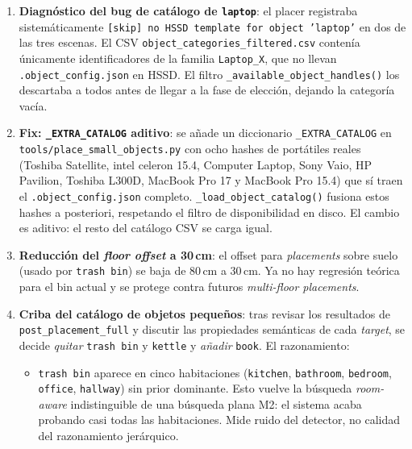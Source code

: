 \documentclass[11pt,a4paper]{article}
\begin{document}
\begin{enumerate}
  \item \textbf{Diagnóstico del bug de catálogo de \texttt{laptop}}:
        el placer registraba sistemáticamente
        \texttt{[skip] no HSSD template for object 'laptop'} en dos de
        las tres escenas. El CSV
        \texttt{object\_categories\_filtered.csv} contenía únicamente
        identificadores de la familia \texttt{Laptop\_X}, que no llevan
        \texttt{.object\_config.json} en HSSD. El filtro
        \texttt{\_available\_object\_handles()} los descartaba a todos
        antes de llegar a la fase de elección, dejando la categoría
        vacía.
  \item \textbf{Fix: \texttt{\_EXTRA\_CATALOG} aditivo}: se añade un
        diccionario \texttt{\_EXTRA\_CATALOG} en
        \texttt{tools/place\_small\_objects.py} con ocho hashes de
        portátiles reales (Toshiba Satellite, intel celeron 15.4,
        Computer Laptop, Sony Vaio, HP Pavilion, Toshiba L300D, MacBook
        Pro 17 y MacBook Pro 15.4) que sí traen el \texttt{.object\_config.json}
        completo. \texttt{\_load\_object\_catalog()} fusiona estos
        hashes a posteriori, respetando el filtro de disponibilidad
        en disco. El cambio es aditivo: el resto del catálogo CSV se
        carga igual.
  \item \textbf{Reducción del \emph{floor offset} a 30\,cm}: el offset
        para \emph{placements} sobre suelo (usado por \texttt{trash bin})
        se baja de 80\,cm a 30\,cm. Ya no hay regresión teórica para el
        bin actual y se protege contra futuros \emph{multi-floor placements}.
  \item \textbf{Criba del catálogo de objetos pequeños}: tras revisar
        los resultados de \texttt{post\_placement\_full} y discutir las
        propiedades semánticas de cada \emph{target}, se decide
        \emph{quitar} \texttt{trash bin} y \texttt{kettle} y
        \emph{añadir} \texttt{book}. El razonamiento:
        \begin{itemize}
          \item \texttt{trash bin} aparece en cinco habitaciones
                (\texttt{kitchen}, \texttt{bathroom}, \texttt{bedroom},
                \texttt{office}, \texttt{hallway}) sin prior dominante.
                Esto vuelve la búsqueda \emph{room-aware} indistinguible
                de una búsqueda plana M2: el sistema acaba probando
                casi todas las habitaciones. Mide ruido del detector,
                no calidad del razonamiento jerárquico.

\end{itemize}
\end{enumerate}
\end{document}

